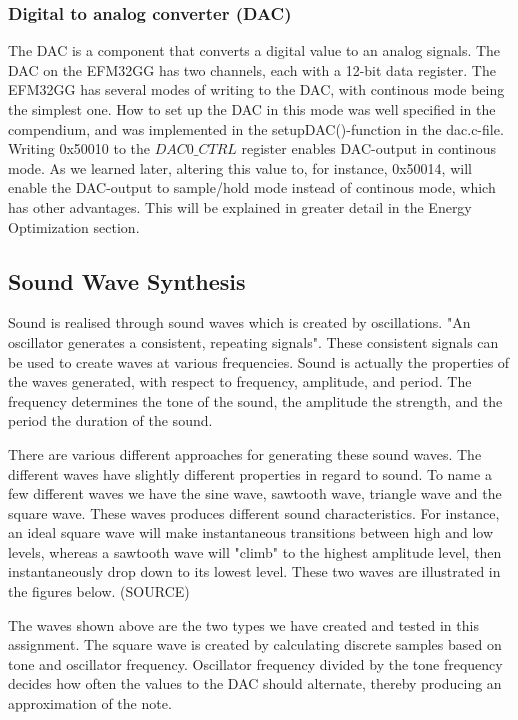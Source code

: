 \subsubsection{Digital to analog converter (DAC)}
The DAC is a component that converts a digital value to an analog signals. The DAC on the EFM32GG has two channels, each with a 12-bit data register. The EFM32GG has several modes of writing to the DAC, with continous mode being the simplest one. How to set up the DAC in this mode was well specified in the compendium, and was implemented in the setupDAC()-function in the dac.c-file. Writing 0x50010 to the $DAC0\_CTRL$ register enables DAC-output in continous mode. As we learned later, altering  this value to, for instance, 0x50014, will enable the DAC-output to sample/hold mode instead of continous mode, which has other advantages. This will be explained in greater detail in the Energy Optimization section.

\subsection{Sound Wave Synthesis}

Sound is realised through sound waves which is created by oscillations. "An oscillator generates a consistent, repeating signals". These consistent signals can be used to create waves at various frequencies. Sound is actually the properties of the waves generated, with respect to frequency, amplitude, and period. The frequency determines the tone of the sound, the amplitude the strength, and the period the duration of the sound.

There are various different approaches for generating these sound waves. The different waves have slightly different properties in regard to sound. To name a few different waves we have the sine wave, sawtooth wave, triangle wave and the square wave. These waves produces different sound characteristics. For instance, an ideal square wave will make instantaneous transitions between high and low levels, whereas a sawtooth wave will "climb" to the highest amplitude level, then instantaneously drop down to its lowest level. These two waves are illustrated in the figures below. (SOURCE)




The waves shown above are the two types we have created and tested in this assignment. The square wave is created by calculating discrete samples based on tone and oscillator frequency. Oscillator frequency divided by the tone frequency decides how often the values to the DAC should alternate, thereby producing an approximation of the note. 

